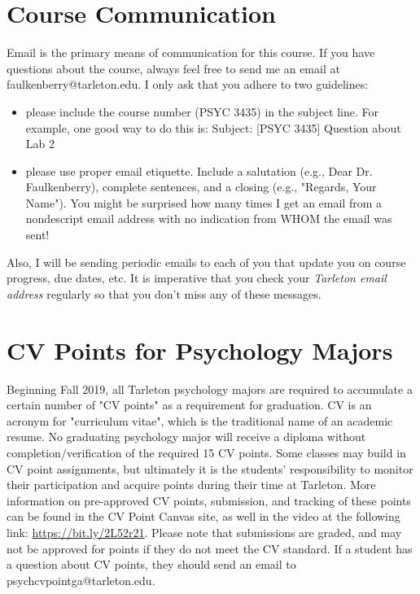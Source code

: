 \documentclass[10pt]{article}
\begin{document}
\section*{Course Communication}
\label{sec:org9bfbdd5}

Email is the primary means of communication for this course.  If you have questions about the course, always feel free to send me an email at faulkenberry@tarleton.edu.  I only ask that you adhere to two guidelines:
\begin{itemize}
\item please include the course number (PSYC 3435) in the subject line.  For example, one good way to do this is:  Subject: [PSYC 3435] Question about Lab 2
\item please use proper email etiquette.  Include a salutation (e.g., Dear Dr. Faulkenberry), complete sentences, and a closing (e.g., "Regards, Your Name").  You might be surprised how many times I get an email from a nondescript email address with no indication from WHOM the email was sent!
\end{itemize}

Also, I will be sending periodic emails to each of you that update you on course progress, due dates, etc.  It is imperative that you check your \emph{Tarleton email address} regularly so that you don't miss any of these messages.

\section*{CV Points for Psychology Majors}
\label{sec:org6c84b8c}
Beginning Fall 2019, all Tarleton psychology majors are required to accumulate a certain number of "CV points" as a requirement for graduation. CV is an acronym for "curriculum vitae", which is the traditional name of an academic resume.  No graduating psychology major will receive a diploma without completion/verification of the required 15 CV points. Some classes may build in CV point assignments, but ultimately it is the students’ responsibility to monitor their participation and acquire points during their time at Tarleton.  More information on pre-approved CV points, submission, and tracking of these points can be found in the CV Point Canvas site, as well in the video at the following link: \url{https://bit.ly/2L52r21}. Please note that submissions are graded, and may not be approved for points if they do not meet the CV standard.  If a student has a question about CV points, they should send an email to psychcvpointga@tarleton.edu.
\end{document}
